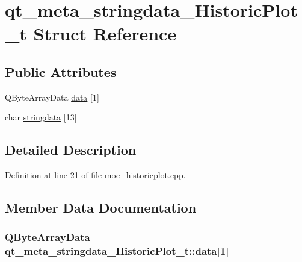 \hypertarget{structqt__meta__stringdata___historic_plot__t}{}\section{qt\+\_\+meta\+\_\+stringdata\+\_\+\+Historic\+Plot\+\_\+t Struct Reference}
\label{structqt__meta__stringdata___historic_plot__t}
\subsection*{Public Attributes}
\begin{DoxyCompactItemize}
\item 
Q\+Byte\+Array\+Data \hyperlink{structqt__meta__stringdata___historic_plot__t_a575a774552efec18a51379a2a4a28a96}{data} \mbox{[}1\mbox{]}
\item 
char \hyperlink{structqt__meta__stringdata___historic_plot__t_a943900759e5308de32b03999227b8b8f}{stringdata} \mbox{[}13\mbox{]}
\end{DoxyCompactItemize}


\subsection{Detailed Description}


Definition at line 21 of file moc\+\_\+historicplot.\+cpp.



\subsection{Member Data Documentation}
\hypertarget{structqt__meta__stringdata___historic_plot__t_a575a774552efec18a51379a2a4a28a96}{}
\subsubsection[{data}]{\setlength{\rightskip}{0pt plus 5cm}Q\+Byte\+Array\+Data qt\+\_\+meta\+\_\+stringdata\+\_\+\+Historic\+Plot\+\_\+t\+::data\mbox{[}1\mbox{]}}\label{structqt__meta__stringdata___historic_plot__t_a575a774552efec18a51379a2a4a28a96}


